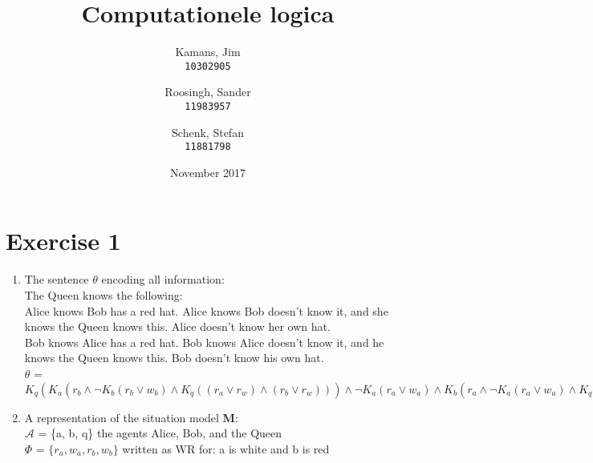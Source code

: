 \documentclass[leqno]{article}
\title{Computationele logica}
\author{
    Kamans, Jim\\
    \texttt{10302905}
    \and
    Roosingh, Sander\\
    \texttt{11983957}
    \and
    Schenk, Stefan\\
    \texttt{11881798}
}
\date{November 2017}
\begin{document}
\maketitle


\section{Exercise 1}

\begin{enumerate}

    \item The sentence $\theta$ encoding all information: \\

    The Queen knows the following: \\
    Alice knows Bob has a red hat. Alice knows Bob doesn't know it, and she
    knows the Queen knows this. Alice doesn't know her own hat. \\
    Bob knows Alice has a red hat. Bob knows Alice doesn't know it, and he
    knows the Queen knows this. Bob doesn't know his own hat. \\

    $\theta$ =
        $K_q (
        K_a (
            r_b \wedge
            \neg K_b (r_b \vee w_b) \wedge
            K_q ((r_a \vee r_w) \wedge (r_b \vee r_w))
        )
        \wedge \neg K_a (r_a \vee w_a)
        \wedge
        K_b (
            r_a \wedge
            \neg K_a (r_a \vee w_a) \wedge
            K_q ((r_a \vee r_w) \wedge (r_b \vee r_w))
        )
        \wedge \neg K_b (r_b \vee w_b)
        )$

    \item A representation of the situation model \textbf{M}: \\

    $\mathcal{A}$ = \{a, b, q\} the agents Alice, Bob, and the Queen \\
    $\Phi$ = $\{r_a, w_a, r_b, w_b\}$ written as WR for:
    a is white and b is red \\


\end{enumerate}
\end{document}
